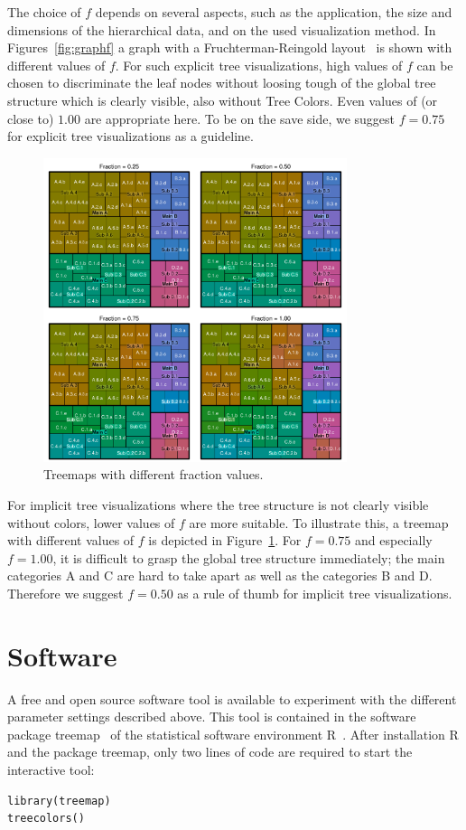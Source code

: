 \documentclass[journal]{vgtc}                %
\begin{document}
The choice of $f$ depends on several aspects, such as the application, the size and dimensions of the hierarchical data, and on the used visualization method. In Figures~\ref{fig:graphf} a graph with a Fruchterman-Reingold layout~\cite{Fruchterman91} is shown with different values of $f$. For such explicit tree visualizations, high values of $f$ can be chosen to discriminate the leaf nodes without loosing tough of the global tree structure which is clearly visible, also without Tree Colors. Even values of (or close to) $1.00$ are appropriate here. To be on the save side, we suggest $f=0.75$ for explicit tree visualizations as a guideline.

\begin{figure}[htb]
  \centering
  \includegraphics[width=3.5in]{Treemaps_hue.pdf}
  \caption{Treemaps with different fraction values.}\label{fig:treemapf}
\end{figure}


For implicit tree visualizations where the tree structure is not clearly visible without colors, lower values of $f$ are more suitable. To illustrate this, a treemap with different values of $f$ is depicted in Figure~\ref{fig:treemapf}. For $f=0.75$ and especially $f=1.00$, it is difficult to grasp the global tree structure immediately; the main categories A and C are hard to take apart as well as the categories B and D. Therefore we suggest $f=0.50$ as a rule of thumb for implicit tree visualizations.

\section{Software}

A free and open source software tool is available to experiment with the different parameter settings described above. This tool is contained in the software package treemap~\cite{treemap} of the statistical software environment R~\cite{r2013}. After installation R and the package treemap, only two lines of code are required to  start the interactive tool:
\begin{lstlisting}
library(treemap)
treecolors()
\end{lstlisting}
\end{document}
